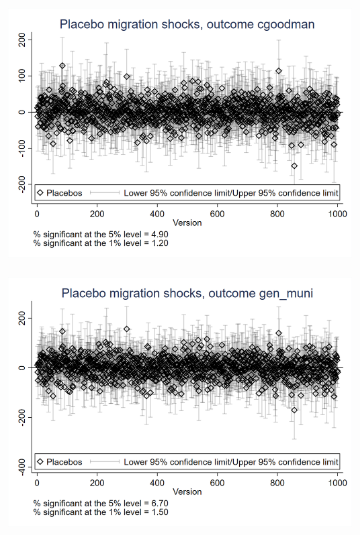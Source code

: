 \documentclass{article}
\begin{document}
\begin{figure}[htbp]
    \centering
    \begin{subfigure}{0.3\textwidth}
        \includegraphics[width=\linewidth]{exhibits/figures/exogeneity_tests/D17_placebo_cgoodman_urban.png}
        \label{fig:sub1}
    \end{subfigure}
    \begin{subfigure}{0.3\textwidth}
        \includegraphics[width=\linewidth]{exhibits/figures/exogeneity_tests/D17_placebo_gen_muni_urban.png}
        \label{fig:sub2}
    \end{subfigure}
    \begin{subfigure}{0.3\textwidth}

\end{subfigure}
\end{figure}
\end{document}
